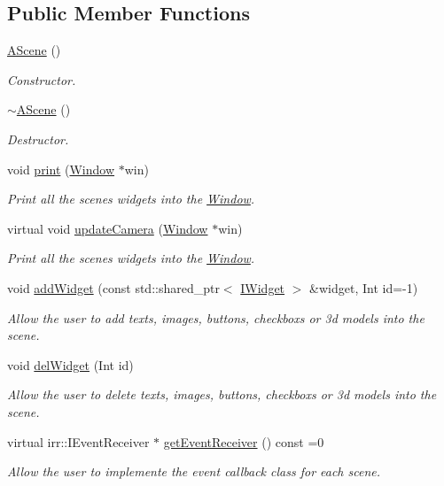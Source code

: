 \subsection*{Public Member Functions}
\begin{DoxyCompactItemize}
\item 
\hyperlink{classAScene_ad0eacf691dbc8240fdf3a42d450c1042}{A\+Scene} ()
\begin{DoxyCompactList}\small\item\em Constructor. \end{DoxyCompactList}\item 
\hyperlink{classAScene_a9faf7f1a271327227e83627432d0b210}{$\sim$\+A\+Scene} ()
\begin{DoxyCompactList}\small\item\em Destructor. \end{DoxyCompactList}\item 
void \hyperlink{classAScene_ae5d7463a823ed64f3846b5847340b68c}{print} (\hyperlink{classWindow}{Window} $\ast$win)
\begin{DoxyCompactList}\small\item\em Print all the scene\textquotesingle{}s widgets into the \hyperlink{classWindow}{Window}. \end{DoxyCompactList}\item 
virtual void \hyperlink{classAScene_a18070899d965f1811c2253ad1d939374}{update\+Camera} (\hyperlink{classWindow}{Window} $\ast$win)
\begin{DoxyCompactList}\small\item\em Print all the scene\textquotesingle{}s widgets into the \hyperlink{classWindow}{Window}. \end{DoxyCompactList}\item 
void \hyperlink{classAScene_aa711b6068dd8dee262160eedfd96ad02}{add\+Widget} (const std\+::shared\+\_\+ptr$<$ \hyperlink{classIWidget}{I\+Widget} $>$ \&widget, Int id=-\/1)
\begin{DoxyCompactList}\small\item\em Allow the user to add texts, images, buttons, checkboxs or 3d models into the scene. \end{DoxyCompactList}\item 
void \hyperlink{classAScene_ad2b0ac8cd74a8523c76b681a34b5f5b4}{del\+Widget} (Int id)
\begin{DoxyCompactList}\small\item\em Allow the user to delete texts, images, buttons, checkboxs or 3d models into the scene. \end{DoxyCompactList}\item 
virtual irr\+::\+I\+Event\+Receiver $\ast$ \hyperlink{classAScene_af521e5e6d30a5d2e5d30eb333e4d3abd}{get\+Event\+Receiver} () const =0
\begin{DoxyCompactList}\small\item\em Allow the user to implemente the event callback class for each scene. \end{DoxyCompactList}\end{DoxyCompactItemize}


